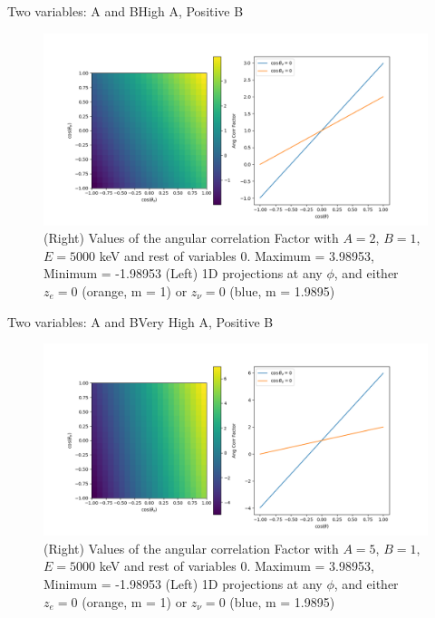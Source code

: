 \documentclass{beamer}
\begin{document}
\begin{frame}{Two variables: A and B}{High A, Positive B}
	\begin{figure}
		\centering
		\includegraphics[width=0.8\paperwidth]{plots/posA_posB_hiA.png}
		\caption{(Right) Values of the angular correlation Factor with $A = 2$, $B = 1$, $E = 5000$ keV and rest of variables 0. Maximum = 3.98953, Minimum = -1.98953 (Left) 1D projections at any $\phi$, and either $z_e = 0$ (orange, m = 1) or $z_\nu = 0$ (blue, m = 1.9895)}	
	\end{figure}
\end{frame}
\begin{frame}{Two variables: A and B}{Very High A, Positive B}
	\begin{figure}
		\centering
		\includegraphics[width=0.8\paperwidth]{plots/posA_posB_vhiA.png}
		\caption{(Right) Values of the angular correlation Factor with $A = 5$, $B = 1$, $E = 5000$ keV and rest of variables 0. Maximum = 3.98953, Minimum = -1.98953 (Left) 1D projections at any $\phi$, and either $z_e = 0$ (orange, m = 1) or $z_\nu = 0$ (blue, m = 1.9895)}	
	\end{figure}
\end{frame}
\end{document}
